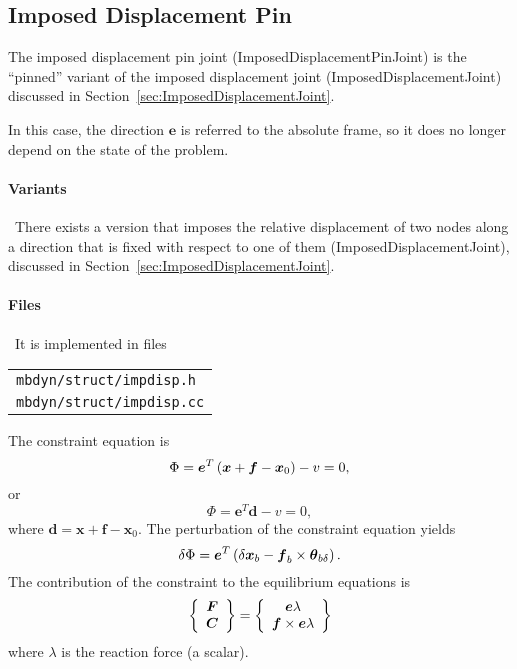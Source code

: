 \documentclass[10pt,dvips,fleqn]{report}
\newcommand{\T}[1]{\boldsymbol{#1}}
\begin{document}
\subsection{Imposed Displacement Pin}
\label{sec:ImposedDisplacementPinJoint}
The imposed displacement pin joint (ImposedDisplacementPinJoint) 
is the ``pinned'' variant of the imposed displacement joint
(ImposedDisplacementJoint) discussed
in Section~\ref{sec:ImposedDisplacementJoint}.

In this case, the direction $\T{e}$ is referred to the absolute frame,
so it does no longer depend on the state of the problem.

\paragraph{Variants} \
There exists a version that imposes the relative displacement of two nodes
along a direction that is fixed with respect to one of them 
(ImposedDisplacementJoint),
discussed in Section~\ref{sec:ImposedDisplacementJoint}.

\paragraph{Files} \
It is implemented in files

\begin{tabular}{l}
\texttt{mbdyn/struct/impdisp.h} \\
\texttt{mbdyn/struct/impdisp.cc}
\end{tabular}

The constraint equation is
\begin{equation}
	\Phi = \T{e}^T \plbr{\T{x} + \T{f} - \T{x}_0} - v = 0 ,
\end{equation}
or
\begin{equation}
	\Phi = \T{e}^T \T{d} - v = 0 ,
\end{equation}
where $\T{d}=\T{x} + \T{f} - \T{x}_0$.
The perturbation of the constraint equation yields
\begin{equation}
	\delta\Phi = 
		\T{e}^T \plbr{\delta\T{x}_b
		- \T{f}_b\times\T{\theta}_{b\delta}
		} .
\end{equation}
The contribution of the constraint to the equilibrium equations is
\begin{equation}
	\cubr{\cvvect{
		\T{F} \\
		\T{C}
	}} = \cubr{\cvvect{
		\T{e} \lambda \\
		\T{f} \times \T{e} \lambda
	}}
\end{equation}
where $\lambda$ is the reaction force (a scalar).
\end{document}
